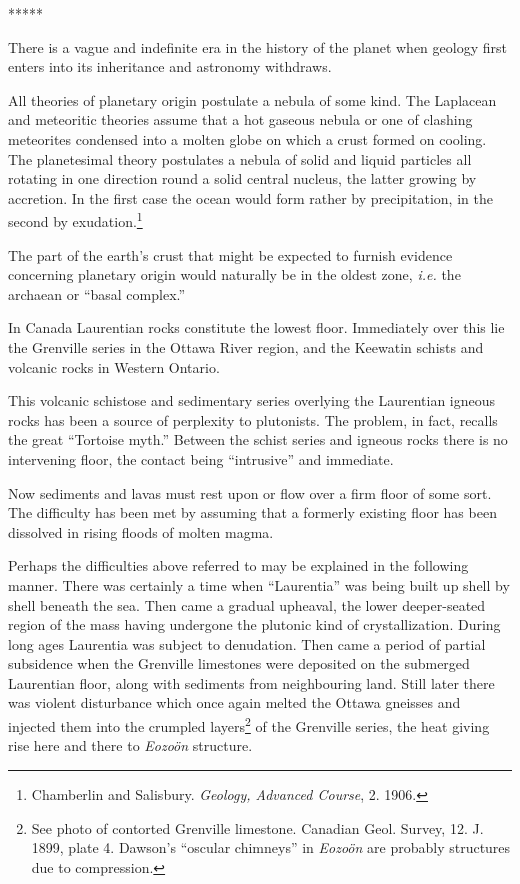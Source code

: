 \documentclass[a4paper, 12pt, oneside]{article}
\begin{document}
\centerline{*\hspace{15mm}*\hspace{15mm}*\hspace{15mm}*\hspace{15mm}*}
\bigskip

There is a vague and indefinite era in the history of the planet when geology first enters into its inheritance and astronomy withdraws.

All theories of planetary origin postulate a nebula of some kind. The Laplacean and meteoritic theories assume that a hot gaseous nebula or one of clashing meteorites condensed into a molten globe on which a crust formed on cooling. The planetesimal theory postulates a nebula of solid and liquid particles all rotating in one direction round a solid central nucleus, the latter growing by accretion. In the first case the ocean would form rather by precipitation, in the second by exudation.\footnote{Chamberlin and Salisbury. \emph{Geology, Advanced Course}, 2. 1906.}

The part of the earth's crust that might be expected to furnish evidence concerning planetary origin would naturally be in the oldest zone, \emph{i.e.} the archaean or ``basal complex.''

In Canada Laurentian rocks constitute the lowest floor. Immediately over this lie the Grenville series in the Ottawa River region, and the Keewatin schists and volcanic rocks in Western Ontario.

This volcanic schistose and sedimentary series overlying the Laurentian igneous rocks has been a source of perplexity to plutonists. The problem, in fact, recalls the great ``Tortoise myth.'' Between the schist series and igneous rocks there is no intervening floor, the contact being ``intrusive'' and immediate.

Now sediments and lavas must rest upon or flow over a firm floor of some sort. The difficulty has been met by assuming that a formerly existing floor has been dissolved in rising floods of molten magma.

Perhaps the difficulties above referred to may be explained in the following manner. There was certainly a time when ``Laurentia'' was being built up shell by shell beneath the sea. Then came a gradual upheaval, the lower deeper-seated region of the mass having undergone the plutonic kind of crystallization. During long ages Laurentia was subject to denudation. Then came a period of partial subsidence when the Grenville limestones were deposited on the submerged Laurentian floor, along with sediments from neighbouring land. Still later there was violent disturbance which once again melted the Ottawa gneisses and injected them into the crumpled layers\footnote{See photo of contorted Grenville limestone. Canadian Geol. Survey, 12. J. 1899, plate 4. Dawson's ``oscular chimneys'' in \emph{Eozoön} are probably structures due to compression.} of the Grenville series, the heat giving rise here and there to \emph{Eozoön} structure.
\end{document}
